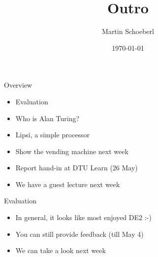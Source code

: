 

\newif\ifbook


\title{Outro}
\author{Martin Schoeberl}
\date{\today}



\begin{frame}
\titlepage
\end{frame}

\begin{frame}[fragile]{Overview}
\begin{itemize}
\item Evaluation
\item Who is Alan Turing?
\item Lipsi, a simple processor
\item Show the vending machine next week
\item Report hand-in at DTU Learn (26 May)
\item We have a guest lecture next week
\end{itemize}
\end{frame}




\begin{frame}[fragile]{Evaluation}
\begin{itemize}
\item In general, it looks like most enjoyed DE2 :-)
\item You can still provide feedback (till May 4)
\item We can take a look next week
\end{itemize}
\end{frame}


